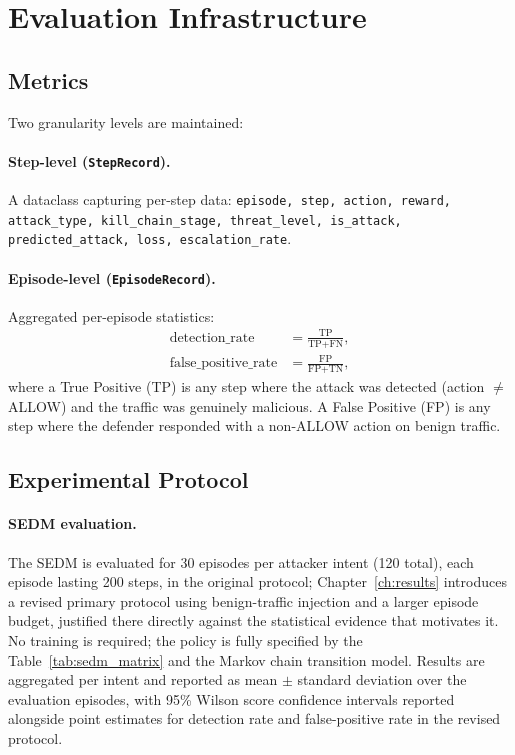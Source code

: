 \section{Evaluation Infrastructure}
\label{sec:eval_infra}

\subsection{Metrics}

Two granularity levels are maintained:

\paragraph{Step-level (\texttt{StepRecord}).}
A dataclass capturing per-step data:
\texttt{episode, step, action, reward, attack\_type, kill\_chain\_stage,
threat\_level, is\_attack, predicted\_attack, loss, escalation\_rate}.

\paragraph{Episode-level (\texttt{EpisodeRecord}).}
Aggregated per-episode statistics:
%
\begin{align}
  \text{detection\_rate} &= \frac{\text{TP}}{\text{TP} + \text{FN}}, \\
  \text{false\_positive\_rate} &= \frac{\text{FP}}{\text{FP} + \text{TN}},
\end{align}
%
where a True Positive (TP) is any step where the attack was detected
(action $\neq$ ALLOW) and the traffic was genuinely malicious.
A False Positive (FP) is any step where the defender responded with a
non-ALLOW action on benign traffic.

\subsection{Experimental Protocol}

\paragraph{SEDM evaluation.}
The SEDM is evaluated for 30 episodes per attacker intent (120 total),
each episode lasting 200 steps, in the original protocol; Chapter~\ref{ch:results}
introduces a revised primary protocol using benign-traffic injection and a
larger episode budget, justified there directly against the statistical
evidence that motivates it.
No training is required; the policy is fully specified by the
Table~\ref{tab:sedm_matrix} and the Markov chain transition model.
Results are aggregated per intent and reported as mean $\pm$ standard
deviation over the evaluation episodes, with 95\% Wilson score confidence
intervals reported alongside point estimates for detection rate and
false-positive rate in the revised protocol.

